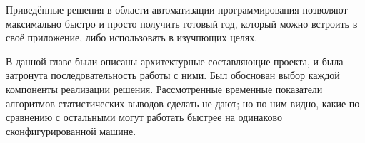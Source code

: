 \tab[0.88cm]Приведённые решения в области автоматизации программирования
позволяют максимально быстро и просто получить готовый год, который можно
встроить в своё приложение, либо использовать в изучпющих целях. 

В данной главе были описаны архитектурные составляющие проекта, и была
затронута последовательность работы с ними. Был обоснован выбор каждой
компоненты реализации решения. Рассмотренные временные показатели алгоритмов
статистических выводов сделать не дают; но по ним видно, какие по сравнению с
остальными могут работать быстрее на одинаково сконфигурированной машине.
